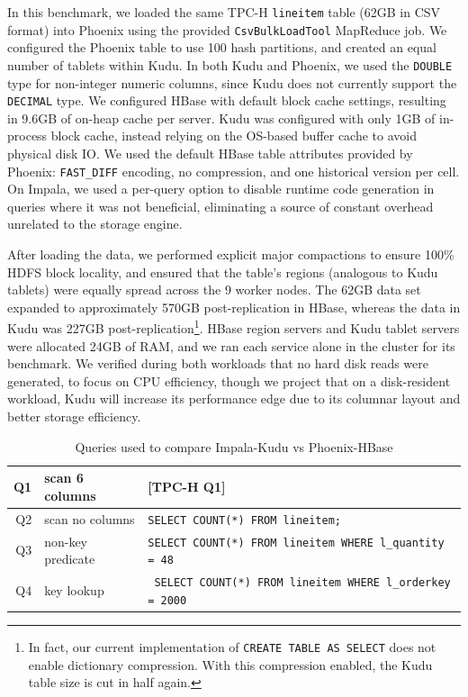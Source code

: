 \documentclass[twocolumn,9pt]{article}
\begin{document}
In this benchmark, we loaded the same TPC-H {\tt lineitem} table (62GB in CSV format) into Phoenix
using the provided {\tt CsvBulkLoadTool} MapReduce job. We configured the Phoenix table to use 100
hash partitions, and created an equal number of tablets within Kudu. In both Kudu and Phoenix,
we used the {\tt DOUBLE} type for non-integer numeric columns, since Kudu does not currently
support the {\tt DECIMAL} type. We configured HBase with default block cache settings,
resulting in 9.6GB of on-heap cache per server. Kudu was configured with only 1GB of in-process
block cache, instead relying on the OS-based buffer cache to avoid physical disk IO.
We used the default HBase table attributes provided by Phoenix: {\tt FAST\_DIFF} encoding,
no compression, and one historical version per cell. On Impala, we used a per-query option
to disable runtime code generation in queries where it was not beneficial, eliminating a source
of constant overhead unrelated to the storage engine.

After loading the data, we performed explicit major compactions to ensure 100\% HDFS block locality,
and ensured that the table's regions (analogous to Kudu tablets) were equally spread across
the 9 worker nodes. The 62GB data set expanded to approximately 570GB post-replication
in HBase, whereas the data in Kudu was 227GB post-replication\footnote{In fact, our current
implementation of {\tt CREATE TABLE AS SELECT} does not enable dictionary compression. With
this compression enabled, the Kudu table size is cut in half again.}.
HBase region servers and Kudu tablet servers were allocated 24GB of RAM, and we ran each
service alone in the cluster for its benchmark. We verified during both workloads that
no hard disk reads were generated, to focus on CPU efficiency, though we project that
on a disk-resident workload, Kudu will increase its performance edge due to its columnar
layout and better storage efficiency.

\begin{table}
\begin{tabular}{r|l|l}
  Q1 & scan 6 columns & [TPC-H Q1]\\\hline
  Q2 & scan no columns & {\tt SELECT COUNT(*) FROM lineitem;}\\\hline
  Q3 & non-key predicate & \parbox{2in}{\tt \vspace{0.2em}SELECT COUNT(*) FROM lineitem WHERE l\_quantity = 48\vspace{0.2em}}\\\hline
  Q4 & key lookup        & \parbox{2in}{\tt \vspace{0.2em} SELECT COUNT(*) FROM lineitem WHERE l\_orderkey = 2000}
\end{tabular}
\caption{Queries used to compare Impala-Kudu vs Phoenix-HBase}
\label{tab:phoenix_queries}
\end{table}
\end{document}
